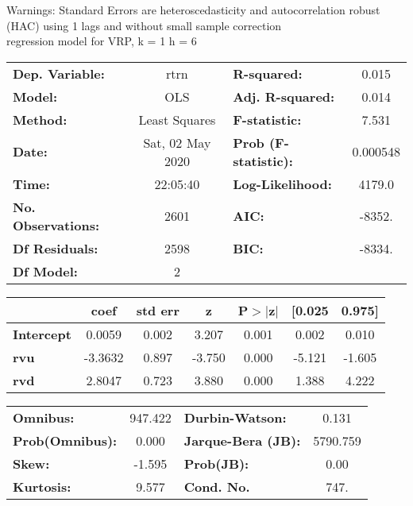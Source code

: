 Warnings: \newline
 [1] Standard Errors are heteroscedasticity and autocorrelation robust (HAC) using 1 lags and without small sample correction\\ 

regression model for VRP, k = 1 h = 6\begin{center}
\begin{tabular}{lclc}
\toprule
\textbf{Dep. Variable:}    &       rtrn       & \textbf{  R-squared:         } &     0.015   \\
\textbf{Model:}            &       OLS        & \textbf{  Adj. R-squared:    } &     0.014   \\
\textbf{Method:}           &  Least Squares   & \textbf{  F-statistic:       } &     7.531   \\
\textbf{Date:}             & Sat, 02 May 2020 & \textbf{  Prob (F-statistic):} &  0.000548   \\
\textbf{Time:}             &     22:05:40     & \textbf{  Log-Likelihood:    } &    4179.0   \\
\textbf{No. Observations:} &        2601      & \textbf{  AIC:               } &    -8352.   \\
\textbf{Df Residuals:}     &        2598      & \textbf{  BIC:               } &    -8334.   \\
\textbf{Df Model:}         &           2      & \textbf{                     } &             \\
\bottomrule
\end{tabular}
\begin{tabular}{lcccccc}
                   & \textbf{coef} & \textbf{std err} & \textbf{z} & \textbf{P$> |$z$|$} & \textbf{[0.025} & \textbf{0.975]}  \\
\midrule
\textbf{Intercept} &       0.0059  &        0.002     &     3.207  &         0.001        &        0.002    &        0.010     \\
\textbf{rvu}       &      -3.3632  &        0.897     &    -3.750  &         0.000        &       -5.121    &       -1.605     \\
\textbf{rvd}       &       2.8047  &        0.723     &     3.880  &         0.000        &        1.388    &        4.222     \\
\bottomrule
\end{tabular}
\begin{tabular}{lclc}
\textbf{Omnibus:}       & 947.422 & \textbf{  Durbin-Watson:     } &    0.131  \\
\textbf{Prob(Omnibus):} &   0.000 & \textbf{  Jarque-Bera (JB):  } & 5790.759  \\
\textbf{Skew:}          &  -1.595 & \textbf{  Prob(JB):          } &     0.00  \\
\textbf{Kurtosis:}      &   9.577 & \textbf{  Cond. No.          } &     747.  \\
\bottomrule
\end{tabular}
\end{center}

